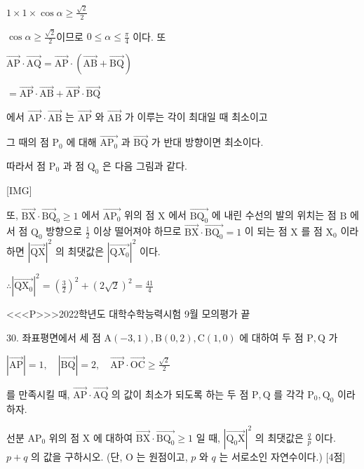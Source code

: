 \documentclass{oblivoir}
\begin{document}
$1 \times 1 \times \cos \alpha \geq \frac{\sqrt{2}}{2} $

$\cos \alpha \geq \frac{\sqrt{2}}{2}$이므로 $0 \leq \alpha \leq \frac{\pi}{4}$ 이다. 또

$\overrightarrow{\mathrm{AP}} \cdot \overrightarrow{\mathrm{AQ}}=\overrightarrow{\mathrm{AP}} \cdot(\overrightarrow{\mathrm{AB}}+\overrightarrow{\mathrm{BQ}})$

$=\overrightarrow{\mathrm{AP}} \cdot \overrightarrow{\mathrm{AB}}+\overrightarrow{\mathrm{AP}} \cdot \overrightarrow{\mathrm{BQ}}$

에서 $\overrightarrow{\mathrm{AP}} \cdot \overrightarrow{\mathrm{AB}}$ 는 $\overrightarrow{\mathrm{AP}}$ 와 $\overrightarrow{\mathrm{AB}}$ 가 이루는 각이 최대일 때 최소이고

그 때의 점 $\mathrm{P}_{0}$ 에 대해 $\overrightarrow{\mathrm{AP}_{0}}$ 과 $\overrightarrow{\mathrm{BQ}}$ 가 반대 방향이면 최소이다.

따라서 점 $\mathrm{P}_{0}$ 과 점 $\mathrm{Q}_{0}$ 은 다음 그림과 같다.

[IMG]

또, $\overrightarrow{\mathrm{BX}} \cdot \overrightarrow{\mathrm{BQ}}_{0} \geq 1$ 에서 $\overrightarrow{\mathrm{AP}_{0}}$ 위의 점 $\mathrm{X}$ 에서 $\overrightarrow{\mathrm{BQ}_{0}}$ 에 내린 수선의 발의 위치는 점 $\mathrm{B}$ 에서 점 $\mathrm{Q}_{0}$ 방향으로 $\frac{1}{2}$ 이상 떨어져야 하므로
$\overrightarrow{\mathrm{BX}} \cdot \overrightarrow{\mathrm{BQ}_{0}}=1$ 이 되는 점 $\mathrm{X}$ 를 점 $\mathrm{X}_{0}$ 이라 하면 $|\overrightarrow{\mathrm{QX}}|^{2}$ 의 최댓값은 $\left|\overrightarrow{\mathrm{Q} X_{0}}\right|^{2}$ 이다.

$\therefore\left|\overrightarrow{\mathrm{Q} \mathrm{X}_{0}}\right|^{2}=\left(\frac{3}{2}\right)^{2}+(2 \sqrt{2})^{2}=\frac{41}{4}$


<<<P>>>2022학년도 대학수학능력시험 9월 모의평가 끝

30. 좌표평면에서 세 점 $\mathrm{A}(-3,1), \mathrm{B}(0,2), \mathrm{C}(1,0)$ 에 대하여 두 점 $\mathrm{P}, \mathrm{Q}$ 가

$|\overrightarrow{\mathrm{AP}}|=1, \quad|\overrightarrow{\mathrm{BQ}}|=2, \quad \overrightarrow{\mathrm{AP}} \cdot \overrightarrow{\mathrm{OC}} \geq \frac{\sqrt{2}}{2}$

를 만족시킬 때, $\overrightarrow{\mathrm{AP}} \cdot \overrightarrow{\mathrm{AQ}}$ 의 값이 최소가 되도록 하는 두 점 $\mathrm{P}, \mathrm{Q}$ 를 각각 $\mathrm{P}_{0}, \mathrm{Q}_{0}$ 이라 하자.

선분 $\mathrm{AP}_{0}$ 위의 점 $\mathrm{X}$ 에 대하여 $\overrightarrow{\mathrm{BX}} \cdot \overrightarrow{\mathrm{BQ}_{0}} \geq 1$ 일 때, $\left|\overrightarrow{\mathrm{Q}_{0} \mathrm{X}}\right|^{2}$ 의 최댓값은 $\frac{q}{p}$ 이다. $p+q$ 의 값을 구하시오. (단, $\mathrm{O}$ 는 원점이고, $p$ 와 $q$ 는 서로소인 자연수이다.) [4점]
\end{document}
